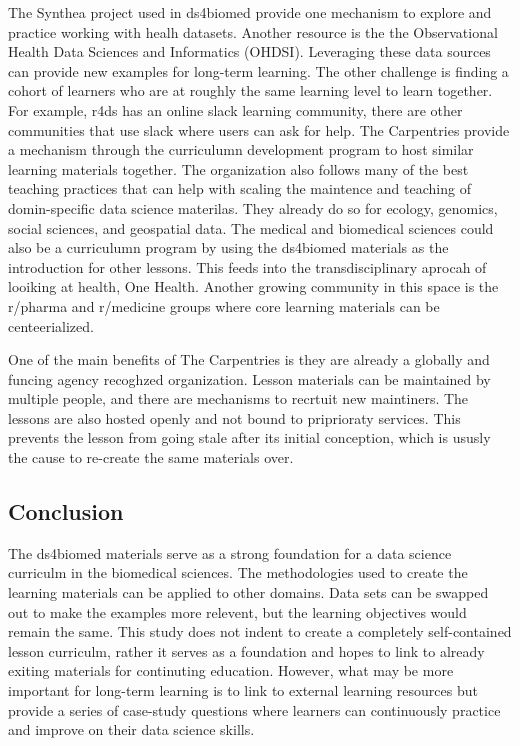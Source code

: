 \documentclass[030-workshop.tex]{subfiles}
\begin{document}
        The Synthea project used in ds4biomed provide one mechanism to explore and practice working with healh datasets.
        Another resource is the the Observational Health Data Sciences and Informatics (OHDSI).
        Leveraging these data sources can provide new examples for long-term learning.
        The other challenge is finding a cohort of learners who are at roughly the same learning level to learn together.
        For example, r4ds has an online slack learning community,
        there are other communities that use slack where users can ask for help.
        The Carpentries provide a mechanism through the curriculumn development program to host similar learning materials together.
        The organization also follows many of the best teaching practices that can help with scaling the maintence and
        teaching of domin-specific data science materilas.
        They already do so for ecology, genomics, social sciences, and geospatial data.
        The medical and biomedical sciences could also be a curriculumn program by using the ds4biomed materials as the introduction
        for other lessons.
        This feeds into the transdisciplinary aprocah of looiking at health, One Health.
        Another growing community in this space is the r/pharma and r/medicine groups where core learning materials
        can be centeerialized.

        One of the main benefits of The Carpentries is they are already a globally and funcing agency recoghzed organization.
        Lesson materials can be maintained by multiple people, and there are mechanisms to recrtuit new maintiners.
        The lessons are also hosted openly and not bound to priprioraty services.
        This prevents the lesson from going stale after its initial conception,
        which is ususly the cause to re-create the same materials over.

    \subsection{Conclusion}

        The ds4biomed materials serve as a strong foundation for a data science curriculm in the biomedical sciences.
        The methodologies used to create the learning materials can be applied to other domains.
        Data sets can be swapped out to make the examples more relevent,
        but the learning objectives would remain the same.
        This study does not indent to create a completely self-contained lesson curriculm,
        rather it serves as a foundation and hopes to link to already exiting materials for continuting education.
        However, what may be more important for long-term learning
        is to link to external learning resources but provide a series of case-study questions
        where learners can continuously practice and improve on their data science skills.
\end{document}
